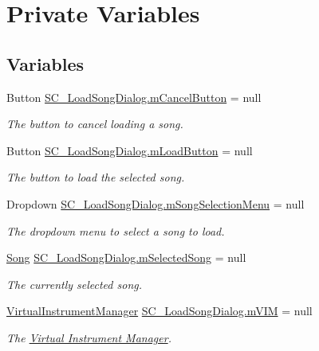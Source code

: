 \hypertarget{group___s_c___l_s_d_priv_var}{}\section{Private Variables}
\label{group___s_c___l_s_d_priv_var}
\subsection*{Variables}
\begin{DoxyCompactItemize}
\item 
Button \hyperlink{group___s_c___l_s_d_priv_var_ga31e17d7ca1cb32f0ad75ef8c7235873f}{S\+C\+\_\+\+Load\+Song\+Dialog.\+m\+Cancel\+Button} = null
\begin{DoxyCompactList}\small\item\em The button to cancel loading a song. \end{DoxyCompactList}\item 
Button \hyperlink{group___s_c___l_s_d_priv_var_gaa27cfb6231ef826024dd063828efa364}{S\+C\+\_\+\+Load\+Song\+Dialog.\+m\+Load\+Button} = null
\begin{DoxyCompactList}\small\item\em The button to load the selected song. \end{DoxyCompactList}\item 
Dropdown \hyperlink{group___s_c___l_s_d_priv_var_ga93543d4b5bf0c2127cb5489112cc29be}{S\+C\+\_\+\+Load\+Song\+Dialog.\+m\+Song\+Selection\+Menu} = null
\begin{DoxyCompactList}\small\item\em The dropdown menu to select a song to load. \end{DoxyCompactList}\item 
\hyperlink{class_song}{Song} \hyperlink{group___s_c___l_s_d_priv_var_ga007db4c9493497f21fb518ab676226a4}{S\+C\+\_\+\+Load\+Song\+Dialog.\+m\+Selected\+Song} = null
\begin{DoxyCompactList}\small\item\em The currently selected song. \end{DoxyCompactList}\item 
\hyperlink{class_virtual_instrument_manager}{Virtual\+Instrument\+Manager} \hyperlink{group___s_c___l_s_d_priv_var_ga6ffbaa999c431dd52e57c242b1b33b49}{S\+C\+\_\+\+Load\+Song\+Dialog.\+m\+V\+IM} = null
\begin{DoxyCompactList}\small\item\em The \hyperlink{group___v_i_m}{Virtual Instrument Manager}. \end{DoxyCompactList}\end{DoxyCompactItemize}


